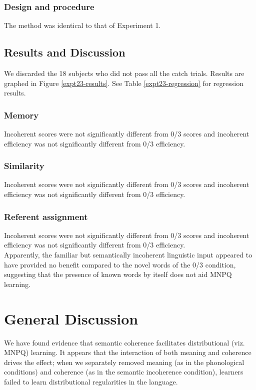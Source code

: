 \documentclass[man,floatsintext]{apa6}
\begin{document}
\subsubsection{Design and procedure} The method was identical to that
of Experiment 1.

\subsection{Results and Discussion}
We discarded the 18 subjects who did not pass all the catch
trials. Results are graphed in Figure \ref{expt23-results}. See Table
\ref{expt23-regression} for regression results.

\subsubsection{Memory}
Incoherent scores were not significantly different from 0/3 scores and
incoherent efficiency was not significantly different from 0/3
efficiency.

\subsubsection{Similarity}
Incoherent scores were not significantly different from 0/3 scores and
incoherent efficiency was not significantly different from 0/3
efficiency.

\subsubsection{Referent assignment}
Incoherent scores were not significantly different from 0/3 scores and incoherent efficiency was not significantly different from 0/3 efficiency.\\

Apparently, the familiar but semantically incoherent linguistic input
appeared to have provided no benefit compared to the novel words of
the 0/3 condition, suggesting that the presence of known words by
itself does not aid MNPQ learning.

\section{General Discussion}

We have found evidence that semantic coherence facilitates
distributional (viz. MNPQ) learning. It appears that the interaction
of both meaning and coherence drives the effect; when we separately
removed meaning (as in the phonological conditions) and coherence (as
in the semantic incoherence condition), learners failed to learn
distributional regularities in the language.
\end{document}
